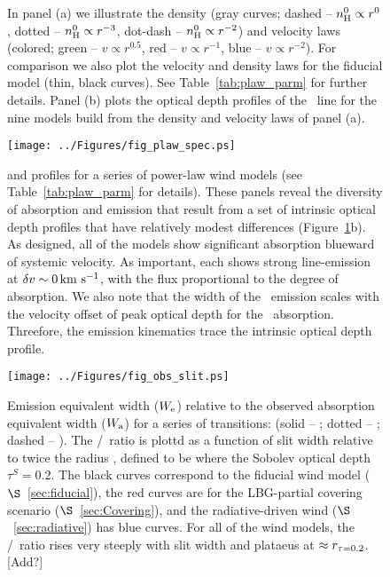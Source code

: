 \documentclass[12pt,preprint]{aastex}
\begin{document}
\begin{figure}
\caption{
In panel (a) we illustrate the density (gray curves; dashed -- $n_{\rm H}^0
\propto r^0$, dotted -- $n_{\rm H}^0 \propto r^{-3}$, dot-dash -- $n_{\rm H}^0
\propto r^{-2}$) and velocity laws (colored; green -- $v \propto
r^{0.5}$, red -- $v \propto r^{-1}$, blue -- $v \propto r^{-2}$).  For
comparison we also plot the velocity and density laws for the fiducial
model (thin, black curves).  See Table~\ref{tab:plaw_parm} for further
details.
Panel (b) plots the optical depth profiles of the \mgiia\ line for
the nine models build from the density and velocity laws of panel (a).
}
\label{fig:plaws}
\end{figure}

\begin{figure}
\texttt{[image: ../Figures/fig\_plaw\_spec.ps]}
\caption{
 and  profiles for a series of power-law wind
models (see Table~\ref{tab:plaw_parm} for details).  These panels reveal
the diversity of absorption and emission that result from a set of
intrinsic optical depth profiles that have relatively modest
differences (Figure~\ref{fig:plaws}b).  As designed, all of the models
show significant absorption blueward of systemic velocity.  As
important, each shows strong line-emission at $\delta v \sim 0 \, {\rm km~s^{-1}}$,
with the flux proportional to the degree of absorption.
We also note that the width of the \feiic\ emission scales with the
velocity offset of peak optical depth for the \feiia\ absorption.
Threefore, the emission kinematics trace the intrinsic
optical depth profile.
}
\label{fig:plaws_spec}
\end{figure}


\begin{figure}
\texttt{[image: ../Figures/fig\_obs\_slit.ps]}
\caption{
Emission equivalent width ($W_{\rm e}$) relative to the observed
absorption equivalent width ($W_{\rm a}$) for a series of transitions:
(solid -- \mgiia; dotted -- \mgiib; dashed -- \feiib).  The
\ewe/\ewabs\ ratio is plottd as a function of slit width relative to
twice the radius \rtt, defined to be where the Sobolev optical depth 
$\tau^S = 0.2$.  The black curves correspond to the fiducial wind
model ($\S$~\ref{sec:fiducial}), the red curves are for the
LBG-partial covering scenario ($\S$~\ref{sec:Covering}), and the
radiative-driven wind ($\S$~\ref{sec:radiative}) has blue curves.
For all of the wind models, the \ewe/\ewabs\ ratio rises very steeply
with slit width and plataeus at $\approx r_{\tau = 0.2}$.  [Add?]
}
\label{fig:obs_slit}
\end{figure}
\end{document}
